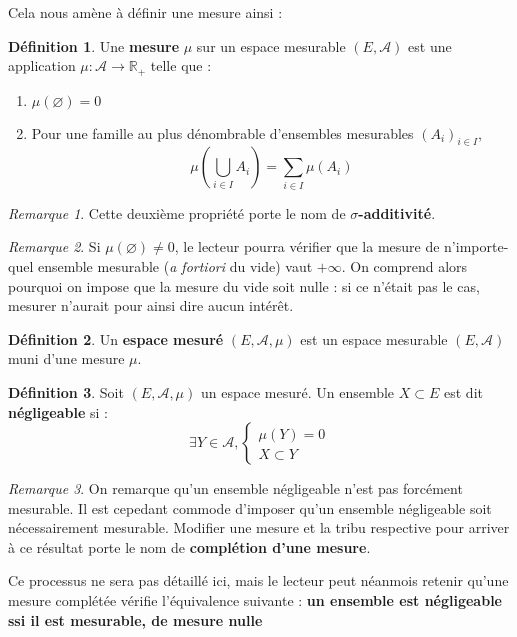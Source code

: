 \documentclass[french]{report}
\theoremstyle{plain}
\theoremstyle{definition}
\newtheorem{defi}{Définition}[section]
\theoremstyle{remark}
\newtheorem{rem}{Remarque}[section]
\begin{document}
Cela nous amène à définir une mesure ainsi :

\begin{defi}
  Une \textbf{mesure} $\mu$ sur un espace mesurable $(E, \mathcal{A})$ est une application $\mu : \mathcal{A} \longrightarrow \mathbb{R}_+$ telle que :
  \begin{enumerate}
    \item $\mu(\varnothing) = 0$
    \item Pour une famille au plus dénombrable d'ensembles mesurables $\left(A_i\right)_{i \in I}$,
    $$\mu\left(\bigcup_{i \in I}A_i\right) = \sum_{i \in I} \mu\left(A_i\right)$$
  \end{enumerate}
\end{defi}

\begin{rem}
  Cette deuxième propriété porte le nom de $\sigma$\textbf{-additivité}.
\end{rem}

\begin{rem}
  Si $\mu(\varnothing) \neq 0$, le lecteur pourra vérifier que la mesure de n'importe-quel ensemble mesurable (\textit{a fortiori} du vide) vaut $+\infty$.
  On comprend alors pourquoi on impose que la mesure du vide soit nulle : si ce n'était pas le cas, mesurer n'aurait pour ainsi dire aucun intérêt.
\end{rem}

\begin{defi}
  Un \textbf{espace mesuré} $\left(E, \mathcal{A}, \mu\right)$ est un espace mesurable $\left(E, \mathcal{A}\right)$ muni d'une mesure $\mu$.
\end{defi}

\begin{defi}
  Soit $\left(E, \mathcal{A}, \mu\right)$ un espace mesuré.
  Un ensemble $X \subset E$ est dit \textbf{négligeable} si :
  $$\exists Y \in \mathcal{A}, 
  \left\{
    \begin{array}{c}
      \mu(Y)=0\\
      X \subset Y
    \end{array}
    \right.$$
\end{defi}

\begin{rem}
  \label{rem:completion}
  On remarque qu'un ensemble négligeable n'est pas forcément mesurable.
  Il est cepedant commode d'imposer qu'un ensemble négligeable soit nécessairement mesurable.
  Modifier une mesure et la tribu respective pour arriver à ce résultat porte le nom de \textbf{complétion d'une mesure}.

  Ce processus ne sera pas détaillé ici, mais le lecteur peut néanmois retenir qu'une mesure complétée vérifie l'équivalence suivante : \textbf{un ensemble est négligeable ssi il est mesurable, de mesure nulle}
\end{rem}
\end{document}
